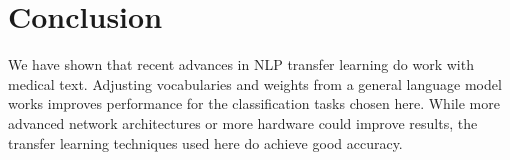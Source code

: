 \documentclass{amia}
\begin{document}
\section*{Conclusion}

We have shown that recent advances in NLP transfer learning do work with medical text. Adjusting vocabularies and weights from a general language model works improves performance for the classification tasks chosen here. While more advanced network architectures or more hardware could improve results, the transfer learning techniques used here do achieve good accuracy.



\end{document}
